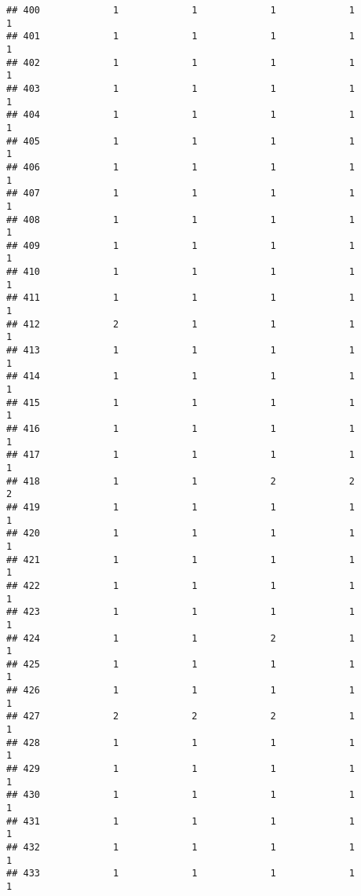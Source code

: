\documentclass[
]{article}
\begin{document}
\begin{verbatim}
## 400             1             1             1             1             1
## 401             1             1             1             1             1
## 402             1             1             1             1             1
## 403             1             1             1             1             1
## 404             1             1             1             1             1
## 405             1             1             1             1             1
## 406             1             1             1             1             1
## 407             1             1             1             1             1
## 408             1             1             1             1             1
## 409             1             1             1             1             1
## 410             1             1             1             1             1
## 411             1             1             1             1             1
## 412             2             1             1             1             1
## 413             1             1             1             1             1
## 414             1             1             1             1             1
## 415             1             1             1             1             1
## 416             1             1             1             1             1
## 417             1             1             1             1             1
## 418             1             1             2             2             2
## 419             1             1             1             1             1
## 420             1             1             1             1             1
## 421             1             1             1             1             1
## 422             1             1             1             1             1
## 423             1             1             1             1             1
## 424             1             1             2             1             1
## 425             1             1             1             1             1
## 426             1             1             1             1             1
## 427             2             2             2             1             1
## 428             1             1             1             1             1
## 429             1             1             1             1             1
## 430             1             1             1             1             1
## 431             1             1             1             1             1
## 432             1             1             1             1             1
## 433             1             1             1             1             1

\end{verbatim}
\end{document}
